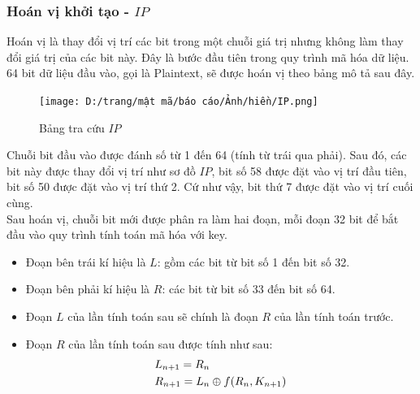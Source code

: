 \subsubsection{Hoán vị khởi tạo - $IP$}
Hoán vị là thay đổi vị trí các bit trong một chuỗi giá trị nhưng không làm thay đổi giá trị của các bit này. Đây là bước đầu tiên trong quy trình mã hóa dữ liệu. 64 bit dữ liệu đầu vào, gọi là Plaintext, sẽ được hoán vị theo bảng mô tả sau đây.
\begin{figure}[H]
    \centering
    \texttt{[image: D:/trang/mật mã/báo cáo/Ảnh/hiền/IP.png]}
    \caption{Bảng tra cứu $IP$}
\end{figure}
\indent Chuỗi bit đầu vào được đánh số từ 1 đến 64 (tính từ trái qua phải). Sau đó, các bit này được thay đổi vị trí như sơ đồ $IP$, bit số 58 được đặt vào vị trí đầu tiên, bit số 50 được đặt vào vị trí thứ 2. Cứ như vậy, bit thứ 7 được đặt vào vị trí cuối cùng.\\
\indent Sau hoán vị, chuỗi bit mới được phân ra làm hai đoạn, mỗi đoạn 32 bit để bắt đầu vào quy trình tính toán mã hóa với key. 
\begin{itemize}
    \item Đoạn bên trái kí hiệu là $L$: gồm các bit từ bit số 1 đến bit số 32.
    \item Đoạn bên phải kí hiệu là $R$: các bit từ bit số 33 đến bit số 64.
    \item Đoạn $L$ của lần tính toán sau sẽ chính là đoạn $R$ của lần tính toán trước. 
    \item Đoạn $R$ của lần tính toán sau được tính như sau:
    \[\begin{gathered}
  {L_{n + 1}} = {R_n} \hfill \\
  {R_{n + 1}} = {L_n} \oplus f({R_n},{K_{n + 1}}) \hfill \\ 
\end{gathered} \]
\end{itemize}
